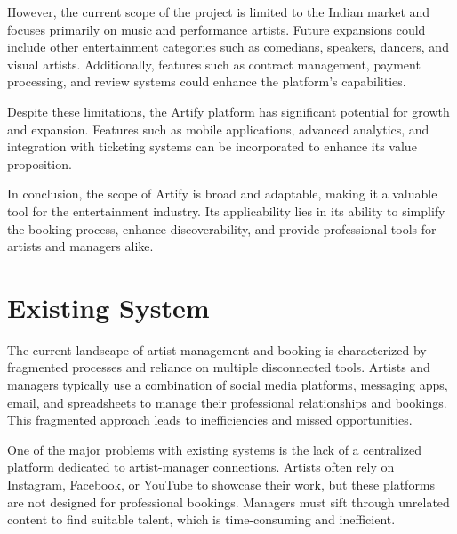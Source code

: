 \documentclass[12pt,a4paper]{report}
\begin{document}
However, the current scope of the project is limited to the Indian market and focuses primarily on music and performance artists. Future expansions could include other entertainment categories such as comedians, speakers, dancers, and visual artists. Additionally, features such as contract management, payment processing, and review systems could enhance the platform's capabilities.

Despite these limitations, the Artify platform has significant potential for growth and expansion. Features such as mobile applications, advanced analytics, and integration with ticketing systems can be incorporated to enhance its value proposition.

In conclusion, the scope of Artify is broad and adaptable, making it a valuable tool for the entertainment industry. Its applicability lies in its ability to simplify the booking process, enhance discoverability, and provide professional tools for artists and managers alike.

\setcounter{chapter}{2}
\clearpage
\thispagestyle{empty}

\noindent
{}

\clearpage
{}
\setcounter{section}{0}
\section{Existing System}
The current landscape of artist management and booking is characterized by fragmented processes and reliance on multiple disconnected tools. Artists and managers typically use a combination of social media platforms, messaging apps, email, and spreadsheets to manage their professional relationships and bookings. This fragmented approach leads to inefficiencies and missed opportunities.

One of the major problems with existing systems is the lack of a centralized platform dedicated to artist-manager connections. Artists often rely on Instagram, Facebook, or YouTube to showcase their work, but these platforms are not designed for professional bookings. Managers must sift through unrelated content to find suitable talent, which is time-consuming and inefficient.
\end{document}
